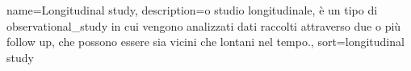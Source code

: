 {
	 name={Longitudinal study},
	 description={o studio longitudinale, \`e un tipo di \gls{observational_study} in cui vengono analizzati dati raccolti attraverso due o pi\`u follow up, che possono essere sia vicini che lontani nel tempo.},
	 sort={longitudinal study}
}

 

%
%
 
 







